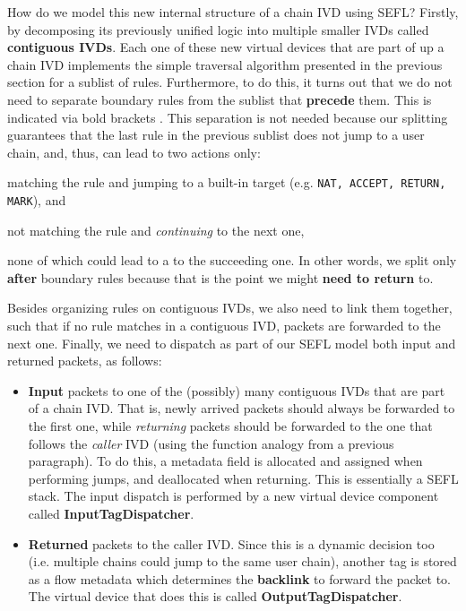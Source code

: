How do we model this new internal structure of a chain IVD using SEFL?
Firstly, by decomposing its previously unified logic into multiple smaller IVDs
called \textbf{contiguous IVDs}. Each one of these new virtual devices that are
part of up a chain IVD implements the simple traversal algorithm presented in
the previous section for a sublist of rules.  Furthermore, to do this, it turns
out that we do not need to separate boundary rules from the sublist that
\textbf{precede} them.  This is indicated via bold brackets
.  This separation is not needed
because our splitting guarantees that the last rule in the previous sublist
does not jump to a user chain, and, thus, can lead to two actions only:
\begin{enumerate*}[a)]
  \item matching the rule and jumping to a built-in target (e.g. \texttt{NAT,
    ACCEPT, RETURN, MARK}), and
  \item not matching the rule and \emph{continuing} to the next one,
\end{enumerate*}
none of which could lead to a \RETURN to the succeeding one.  In other words,
we split only \textbf{after} boundary rules because that is the point we might
\textbf{need to return} to.

Besides organizing rules on contiguous IVDs, we also need to link them
together, such that if no rule matches in a contiguous IVD, packets are
forwarded to the next one.  Finally, we need to dispatch as part of our SEFL
model both input and returned packets, as follows:
\begin{itemize}
  \item \textbf{Input} packets to one of the (possibly) many contiguous IVDs
    that are part of a chain IVD.  That is, newly arrived packets should always
    be forwarded to the first one, while \emph{returning} packets should be
    forwarded to the one that follows the \emph{caller} IVD (using the function
    analogy from a previous paragraph).  To do this, a metadata field is
    allocated and assigned when performing jumps, and deallocated when
    returning.  This is essentially a SEFL stack.  The input dispatch is
    performed by a new virtual device component called
    \textbf{InputTagDispatcher}.
  \item \textbf{Returned} packets to the caller IVD. Since this is a dynamic
    decision too (i.e. multiple chains could jump to the same user chain),
    another tag is stored as a flow metadata which determines the
    \textbf{backlink} to forward the packet to.  The virtual device that does
    this is called \textbf{OutputTagDispatcher}.
\end{itemize}

